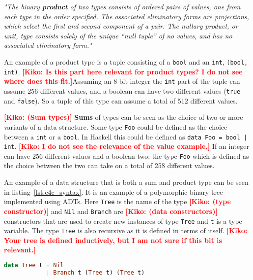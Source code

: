 \documentclass[10pt]{report}
\newcommand{\KIKO}[1]{\textcolor{red}{\textbf{[Kiko: #1]}}}
\def\code#1{\texttt{#1}} %
\begin{document}
\par{\textit{"The binary \textbf{product} of two types consists of ordered pairs of values, one from each type in the order specified. The associated eliminatory forms are projections, which select the first and second component of a pair. The nullary product, or unit, type consists solely of the unique “null tuple” of no values, and has no associated eliminatory form."}}
\par{An example of a product type is a tuple consisting of a \code{bool} and an \code{int}, \code{(bool, int)}. \KIKO{Is this part here relevant for product types? I do not see where does this fit.}Assuming an 8 bit integer the \code{int} part of the tuple can assume 256 different values, and a boolean can have two different values (\code{true} and \code{false}). So a tuple of this type can assume a total of 512 different values.}
\par{\KIKO{(Sum types)} \textbf{Sums} of types can be seen as the choice of two or more variants of a data structure. Some type \code{Foo} could be defined as the choice between a \code{int} or a \code{bool}. In Haskell this could be defined as \code{data Foo = bool | int}. \KIKO{I do not see the relevance of the value example.} If an integer can have 256 different values and a boolean two; the type \code{Foo} which is defined as the choice between the two can take on a total of 258 different values.}

\par{An example of a data structure that is both a sum and product type can be seen in listing~\ref{lst:e4c_syntax}. It is an example of a polymorphic binary tree implemented using ADTs. Here \code{Tree} is the name of the type \KIKO{(type constructor)} and \code{Nil} and \code{Branch} are \KIKO{(data constructors)} constructors that are used to create new instances of type \code{Tree} and \code{t} is a type variable. The type \code{Tree} is also recursive as it is defined in terms of itself.
\KIKO{Your tree is defined inductively, but I am not sure if this bit is relevant.}}


\begin{lstlisting}[language=Haskell,caption={Binary tree definition in Haskell},label={lst:e4c_syntax}]
data Tree t = Nil
            | Branch t (Tree t) (Tree t)
\end{lstlisting}
\end{document}
